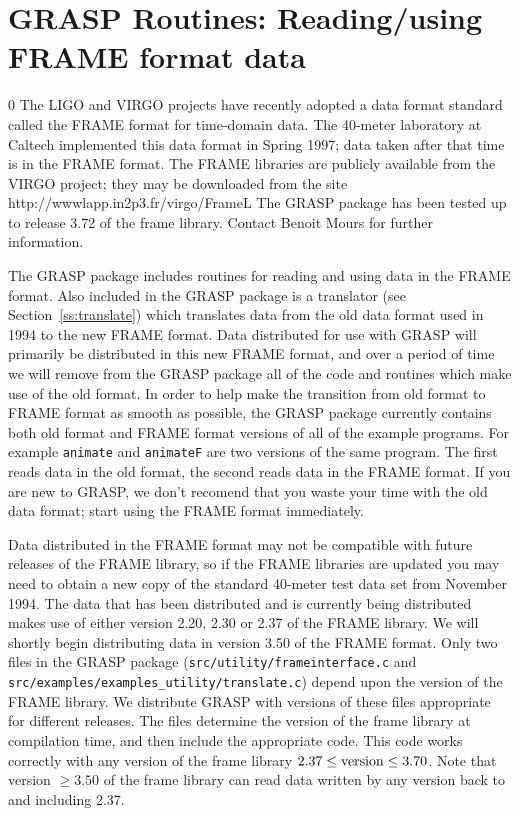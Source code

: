 \section{GRASP Routines: Reading/using FRAME format data}
\setcounter{equation}0
\label{s:frameformat}
The LIGO and VIRGO projects have recently adopted a data format standard
called the FRAME format for time-domain data.  The 40-meter laboratory
at Caltech implemented this data format in Spring 1997; data taken after
that time is in the FRAME format.  The FRAME libraries are publicly
available from the VIRGO project; they may be downloaded from the site
{http://wwwlapp.in2p3.fr/virgo/FrameL}
The GRASP package has been
tested up to release 3.72 of the frame library. Contact Benoit Mours for further information.

The GRASP package includes routines for reading and using data in the
FRAME format.  Also included in the GRASP package is a translator (see
Section~\ref{ss:translate}) which translates data from the old data format
used in 1994 to the new FRAME format.  Data distributed for use with
GRASP will primarily be distributed in this new FRAME format, and over
a period of time we will remove from the GRASP package all of the code
and routines which make use of the old format.  In order to help make
the transition from old format to FRAME format as smooth as possible,
the GRASP package currently contains both old format and FRAME format
versions of all of the example programs.  For example {\tt animate}
and {\tt animateF} are two versions of the same program.  The first
reads data in the old format, the second reads data in the FRAME format.
If you are new to GRASP, we don't recomend that you waste your time with
the old data format; start using the FRAME format immediately.

Data distributed in the FRAME format may not be compatible with future
releases of the FRAME library, so if the FRAME libraries are updated you
may need to obtain a new copy of the standard 40-meter test data set from
November 1994.  The data that has been distributed and is currently being
distributed makes use of either version 2.20, 2.30 or 2.37 of the
FRAME library.  We will shortly begin distributing data in version
3.50 of the FRAME format.
Only two files in the GRASP package ({\tt src/\-utility/\-frameinterface.c}
and {\tt src/\-examples/\-examples\_utility/\-translate.c}) depend upon the
version of the FRAME library.  We distribute GRASP with versions of
these files appropriate for different releases.
The files determine the version of the frame library at compilation
time, and then include the appropriate code.  This code works
correctly with any version of the frame library $2.37 \le {\rm
version} \le 3.70$.  Note that version $\ge 3.50$ of the frame library can
read data written by any version back to and including 2.37.

